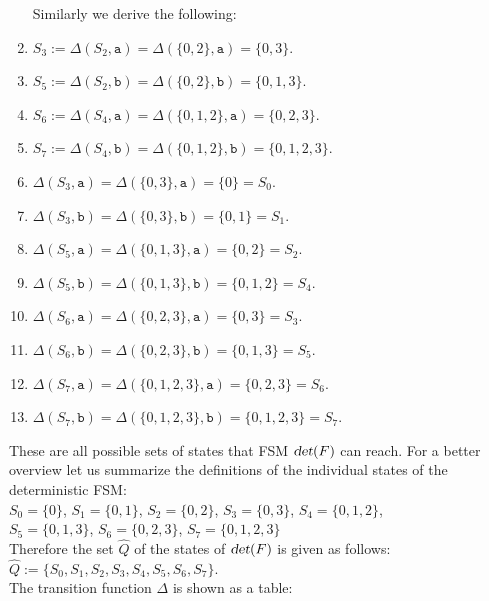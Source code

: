 \begin{enumerate}
      Similarly we derive the following:
\item $S_3 := \Delta(S_2, \texttt{a}) = \Delta(\{ 0, 2 \}, \texttt{a}) = \{0, 3 \}$.
\item $S_5 := \Delta(S_2, \texttt{b}) = \Delta(\{ 0, 2 \}, \texttt{b}) = \{0, 1, 3 \}$.
\item $S_6 := \Delta(S_4, \texttt{a}) = \Delta(\{ 0, 1, 2 \}, \texttt{a}) = \{0, 2, 3 \}$.
\item $S_7 := \Delta(S_4, \texttt{b}) = \Delta(\{ 0, 1, 2 \}, \texttt{b}) = \{0, 1, 2, 3 \}$.
\item $\Delta(S_3, \texttt{a}) = \Delta(\{ 0, 3 \}, \texttt{a}) = \{0 \} = S_0$.
\item $\Delta(S_3, \texttt{b}) = \Delta(\{ 0, 3 \}, \texttt{b}) = \{ 0, 1 \} = S_1$.
\item $\Delta(S_5, \texttt{a}) = \Delta(\{ 0, 1, 3 \}, \texttt{a}) = \{ 0, 2 \} = S_2$.
\item $\Delta(S_5, \texttt{b}) = \Delta(\{ 0, 1, 3 \}, \texttt{b}) = \{ 0, 1, 2 \} = S_4$.
\item $\Delta(S_6, \texttt{a}) = \Delta(\{ 0, 2, 3 \}, \texttt{a}) = \{ 0, 3 \} = S_3$.
\item $\Delta(S_6, \texttt{b}) = \Delta(\{ 0, 2, 3 \}, \texttt{b}) = \{ 0, 1, 3 \} = S_5$.
\item $\Delta(S_7, \texttt{a}) = \Delta(\{ 0, 1, 2, 3 \}, \texttt{a}) = \{ 0, 2, 3 \} = S_6$.
\item $\Delta(S_7, \texttt{b}) = \Delta(\{ 0, 1, 2, 3 \}, \texttt{b}) = \{ 0, 1, 2, 3 \} = S_7$.
\end{enumerate}
These are all possible sets of states that \textsc{FSM} $\textsl{det}(F)$ can reach.
For a better overview let us summarize the definitions of the individual states of the deterministic \textsc{FSM}:
\\[0.2cm]
\hspace*{1.3cm} $S_0 = \{ 0 \}$, $S_1 = \{ 0, 1 \}$, $S_2 = \{ 0, 2 \}$, $S_3 = \{ 0, 3 \}$, $S_4 = \{ 0, 1, 2 \}$, 
\\[0.2cm]
\hspace*{1.3cm} $S_5 = \{ 0, 1, 3 \}$, $S_6 = \{ 0, 2, 3 \}$, $S_7 = \{ 0, 1, 2, 3 \}$
\\[0.2cm]
Therefore the set $\widehat{Q}$ of the states of $\textsl{det}(F)$ is given as follows:
\\[0.2cm]
\hspace*{1.3cm}
$\widehat{Q} := \{ S_0, S_1, S_2, S_3, S_4, S_5, S_6, S_7 \}$.
\\[0.2cm]
The transition function $\Delta$ is shown as a table:

